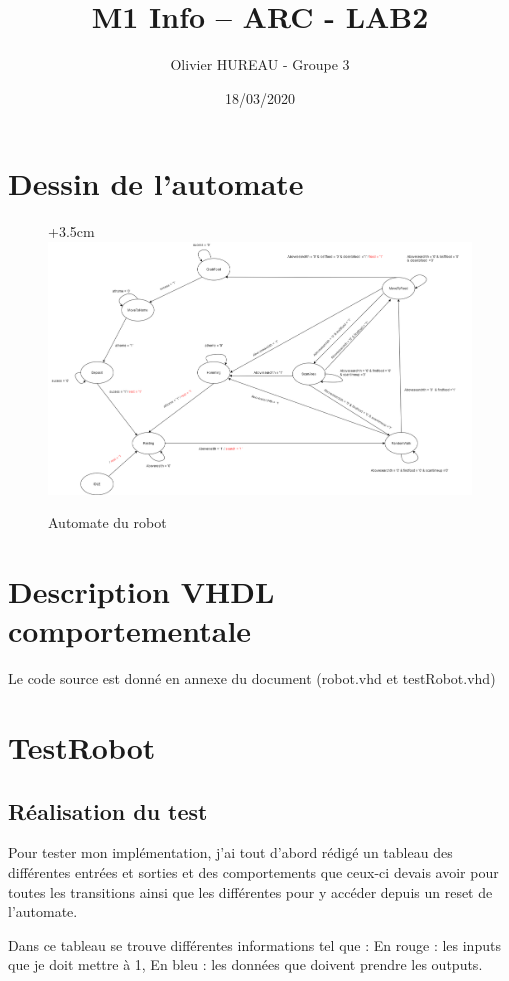 \documentclass{article}
\title{M1 Info – ARC - LAB2}
\author{Olivier HUREAU - Groupe 3}
\date{18/03/2020}
\begin{document}
\maketitle

\section{Dessin de l'automate}

\begin{figure}[!h]
\advance\leftskip+3.5cm
\includegraphics[scale=0.36, angle=-90]{Automate.png}
\caption{Automate du robot}
\end{figure}

\newpage
\section{Description VHDL comportementale}
Le code source est donné en annexe du document (robot.vhd et testRobot.vhd)

\section{TestRobot}
\subsection{Réalisation du test}
Pour tester mon implémentation, j'ai tout d'abord rédigé un tableau des différentes entrées et sorties et des comportements que ceux-ci devais avoir pour toutes les transitions ainsi que les différentes pour y accéder depuis un reset de l'automate.

Dans ce tableau se trouve différentes informations tel que : En rouge :  les inputs que je doit mettre à 1, En bleu : les données que doivent prendre les outputs. 
\end{document}
